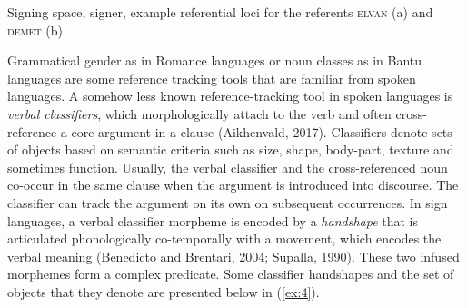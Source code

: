 \documentclass[]{elsarticle} %
\begin{document}
    \begin{exe}
    \ex \label{ex:3} Signing space, signer, example referential loci for the referents \textsc{elvan} (a) and \textsc{demet} (b) \\

    \end{exe}

Grammatical gender as in Romance languages or noun classes as in Bantu
languages are some reference tracking tools that are familiar from
spoken languages. A somehow less known reference-tracking tool in spoken
languages is \emph{verbal classifiers}, which morphologically attach to
the verb and often cross-reference a core argument in a clause
(Aikhenvald, 2017). Classifiers denote sets of objects based on semantic
criteria such as size, shape, body-part, texture and sometimes function.
Usually, the verbal classifier and the cross-referenced noun co-occur in
the same clause when the argument is introduced into discourse. The
classifier can track the argument on its own on subsequent occurrences.
In sign languages, a verbal classifier morpheme is encoded by a
\emph{handshape} that is articulated phonologically co-temporally with a
movement, which encodes the verbal meaning (Benedicto and Brentari,
2004; Supalla, 1990). These two infused morphemes form a complex
predicate. Some classifier handshapes and the set of objects that they
denote are presented below in (\ref{ex:4}).
\end{document}
